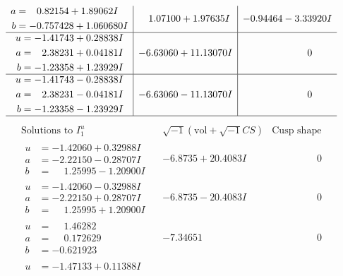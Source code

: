 \documentclass[1p]{elsarticle_modified}
\theoremstyle{definition}
\newcommand{\I}{\sqrt{-1}}
\begin{document}
$$\begin{array}{c|c|c}
\begin{aligned}
a &= \phantom{-}0.82154 + 1.89062 I \\
b &= -0.757428 + 1.060680 I\end{aligned}
 & \phantom{-}1.07100 + 1.97635 I & -0.94464 - 3.33920 I \\ \hline\begin{aligned}
u &= -1.41743 + 0.28838 I \\
a &= \phantom{-}2.38231 + 0.04181 I \\
b &= -1.23358 + 1.23929 I\end{aligned}
 & -6.63060 + 11.13070 I & \phantom{-0.000000 } 0 \\ \hline\begin{aligned}
u &= -1.41743 - 0.28838 I \\
a &= \phantom{-}2.38231 - 0.04181 I \\
b &= -1.23358 - 1.23929 I\end{aligned}
 & -6.63060 - 11.13070 I & \phantom{-0.000000 } 0\\
 \hline 
 \end{array}$$\newpage$$\begin{array}{c|c|c}  
\text{Solutions to }I^u_{1}& \I (\text{vol} + \sqrt{-1}CS) & \text{Cusp shape}\\
 \hline 
\begin{aligned}
u &= -1.42060 + 0.32988 I \\
a &= -2.22150 - 0.28707 I \\
b &= \phantom{-}1.25995 - 1.20900 I\end{aligned}
 & -6.8735 + 20.4083 I & \phantom{-0.000000 } 0 \\ \hline\begin{aligned}
u &= -1.42060 - 0.32988 I \\
a &= -2.22150 + 0.28707 I \\
b &= \phantom{-}1.25995 + 1.20900 I\end{aligned}
 & -6.8735 - 20.4083 I & \phantom{-0.000000 } 0 \\ \hline\begin{aligned}
u &= \phantom{-}1.46282\phantom{ +0.000000I} \\
a &= \phantom{-}0.172629\phantom{ +0.000000I} \\
b &= -0.621923\phantom{ +0.000000I}\end{aligned}
 & -7.34651\phantom{ +0.000000I} & \phantom{-0.000000 } 0 \\ \hline\begin{aligned}
u &= -1.47133 + 0.11388 I \\

\end{aligned}
\end{array}$$
\end{document}
